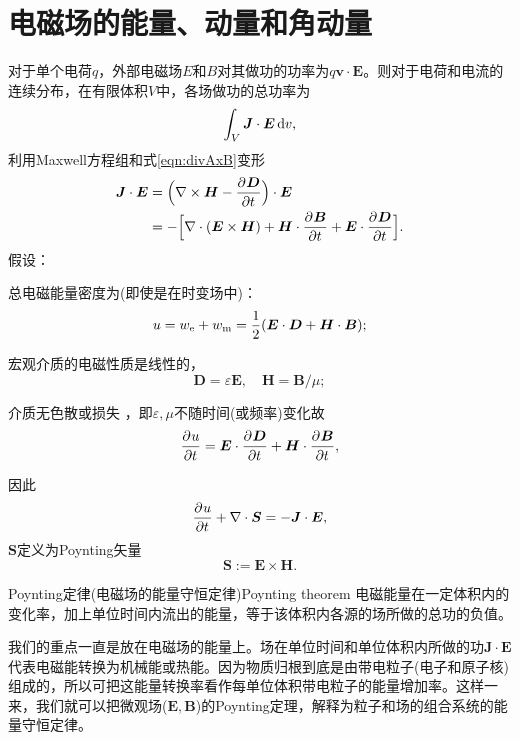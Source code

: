 \section{电磁场的能量、动量和角动量}
对于单个电荷$q$，外部电磁场$E$和$B$对其做功的功率为$q\bm v\cdot\bm E$。则对于电荷和电流的连续分布，在有限体积$V$中，各场做功的总功率为
\[
    \int_V\bm J\cdot\bm E\mathop{}\!\mathrm{d} v,
\]
利用Maxwell方程组和式\eqref{eqn:divAxB}变形
\begin{align*}
    \bm J\cdot\bm E&=\Bigl(\nabla\times\bm H-\frac{\partial^{{}}\bm D}{\partial{t}^{{}}}\Bigr)\cdot\bm E\\
    &=-\Bigl[\nabla\cdot(\bm E\times\bm H)+\bm H\cdot\frac{\partial^{{}}\bm B}{\partial{t}^{{}}}+\bm E\cdot\frac{\partial^{{}}\bm D}{\partial{t}^{{}}}\Bigr].
\end{align*}
假设：
\begin{compactenum}
    \item 总电磁能量密度为(即使是在时变场中)：
    \[
        u=w_\elc+w_\text m=\frac12(\bm E\cdot\bm D+\bm H\cdot\bm B);%
    \]
	\item 宏观介质的电磁性质是线性的，
    \[
        \bm D=\varepsilon\bm E,\quad\bm H=\bm B/\mu;
    \]
    \item 介质无色散或损失%
    ，即$\varepsilon,\mu$不随时间(或频率)变化故
    \[
        \frac{\partial^{{}}u}{\partial{t}^{{}}}=\bm E\cdot\frac{\partial^{{}}\bm D}{\partial{t}^{{}}}+\bm H\cdot\frac{\partial^{{}}\bm B}{\partial{t}^{{}}},
    \]
\end{compactenum}
因此 
\begin{align}
    \frac{\partial^{{}}u}{\partial{t}^{{}}}+\nabla\cdot\bm S=-\bm J\cdot\bm E,
\end{align}
$\bm S$定义为Poynting矢量
\begin{equation}
    \bm S:=\bm E\times\bm H.
\end{equation}
\begin{theorem}{Poynting定律(电磁场的能量守恒定律)}{Poynting theorem}
    电磁能量在一定体积内的变化率，加上单位时间内流出的能量，等于该体积内各源的场所做的总功的负值。
\end{theorem}
我们的重点一直是放在电磁场的能量上。场在单位时间和单位体积内所做的功$\bm J\cdot\bm E$代表电磁能转换为机械能或热能。因为物质归根到底是由带电粒子(电子和原子核)组成的，所以可把这能量转换率看作每单位体积带电粒子的能量增加率。这样一来，我们就可以把微观场($\bm E,\bm B$)的Poynting定理，解释为粒子和场的组合系统的能量守恒定律。%
